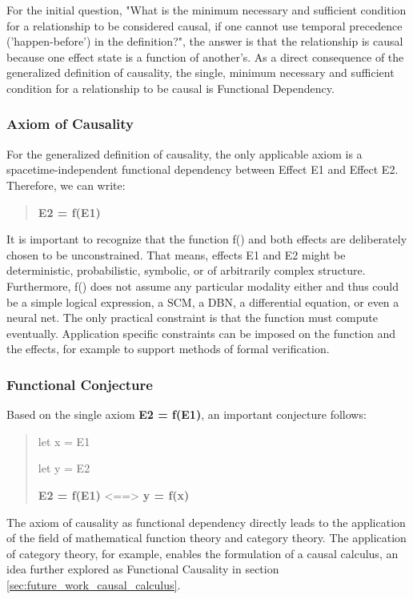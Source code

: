 For the initial question, "What is the minimum necessary and sufficient condition for a relationship to be considered causal, 
	if one cannot use temporal precedence ('happen-before') in the definition?", the answer is that the relationship is causal because one effect state is a function of another's. As a direct consequence of the generalized definition of causality, the single, minimum necessary and sufficient condition for a relationship to be causal is Functional Dependency. 

\subsubsection{Axiom of Causality}
\label{sub:epp_axiom_causality}


 For the generalized definition of causality, the only applicable axiom is a spacetime-independent functional dependency between Effect E1 and Effect E2. Therefore, we can write:

\begin{quotation}
	\textbf{E2 = f(E1)}
\end{quotation}

It is important to recognize that the function f() and both effects are deliberately chosen to be unconstrained. That means, effects E1 and E2 might be deterministic, probabilistic, symbolic, or of arbitrarily complex structure. Furthermore, f() does not assume any particular modality either and thus could be a simple logical expression, a SCM, a DBN, a differential equation, or even a neural net. The only practical constraint is that the function must compute eventually. Application specific constraints can be imposed on the function and the effects, for example to support methods of formal verification.  

\subsubsection{Functional Conjecture}
\label{sub:epp_functional_conjecture}

Based on the single axiom \textbf{E2 = f(E1)}, an important conjecture follows:

\begin{quote}
	let x = E1 
	
	let y = E2\newline

	\textbf{E2 = f(E1)} <==> \textbf{y = f(x)} 
\end{quote}

 The axiom of causality as functional dependency directly leads to the application of the field of mathematical function theory and category theory. The application of category theory, for example, enables the formulation of a causal calculus, an idea further explored as Functional Causality in section \ref{sec:future_work_causal_calculus}.

